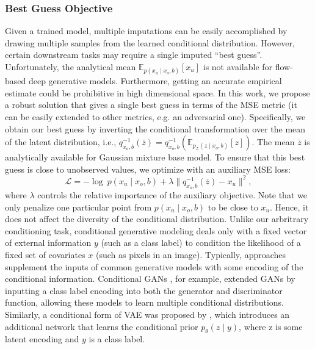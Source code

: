 \documentclass[letterpaper]{article} %
\begin{document}
\subsubsection{Best Guess Objective}
Given a trained model, multiple imputations can be easily accomplished by drawing multiple samples from the learned conditional distribution.
However, certain downstream tasks may require a single imputed ``best guess''. Unfortunately, the analytical mean $\mathbb{E}_{p(x_u \mid x_o,b)}[x_u]$  is not available for flow-based deep generative models. Furthermore, getting an accurate empirical estimate could be prohibitive in high dimensional space.
In this work, we propose a robust solution that gives a single best guess in terms of the MSE metric (it can be easily extended to other metrics, e.g. an adversarial one).
Specifically, we obtain our best guess by inverting the conditional transformation over the mean of the latent distribution, i.e., $q_{x_o,b}^{-1}(\bar{z})=q_{x_o,b}^{-1}(\mathbb{E}_{p_{\mathcal{Z}}(z \mid x_o,b)}[z])$.  The mean $\bar{z}$ is analytically available for Gaussian mixture base model.
To ensure that this best guess is close to unobserved values, we optimize with an auxiliary MSE loss:
\begin{equation}
    \mathcal{L} = -\log~p(x_u \mid x_o, b) + \lambda \|q_{x_o,b}^{-1}(\bar{z}) - x_u \|^2,
\end{equation}
where $\lambda$ controls the relative importance of the auxiliary objective.
Note that we only penalize one particular point from $p(x_u \mid x_o,b)$ to be close to $x_u$. Hence, it does not affect the diversity of the conditional distribution. 
Unlike our arbritrary conditioning task, conditional generative modeling deals only with a fixed vector of external information $y$ (such as a class label) to condition the likelihood of a fixed set of covariates $x$ (such as pixels in an image).
Typically, approaches supplement the inputs of common generative models with some encoding of the conditional information.
Conditional GANs , for example, extended GANs by inputting a class label encoding into both the generator and discriminator function, allowing these models to learn multiple conditional distributions. 
Similarly, a conditional form of VAE was proposed by , which introduces an additional network that learns the conditional prior $p_\theta(z \mid y)$, where z is some latent encoding and $y$ is a class label. 
\end{document}

